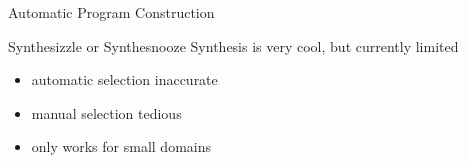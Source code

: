 \documentclass{beamer}
\begin{document}
\begin{frame}{Automatic Program Construction}
  \begin{block}{Synthesizzle or Synthesnooze}
    Synthesis is very cool, but currently limited

    \begin{itemize}
      \item automatic selection inaccurate
      \item manual selection tedious
      \item only works for small domains
    \end{itemize}
  \end{block}
\end{frame}








\end{document}
